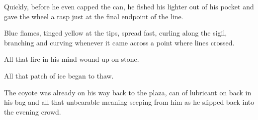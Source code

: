 Quickly, before he even capped the can, he fished his lighter out of his pocket and gave the wheel a rasp just at the final endpoint of the line.

Blue flames, tinged yellow at the tips, spread fast, curling along the sigil, branching and curving whenever it came across a point where lines crossed.

All that fire in his mind wound up on stone.

All that patch of ice began to thaw.

The coyote was already on his way back to the plaza, can of lubricant on back in his bag and all that unbearable meaning seeping from him as he slipped back into the evening crowd.
